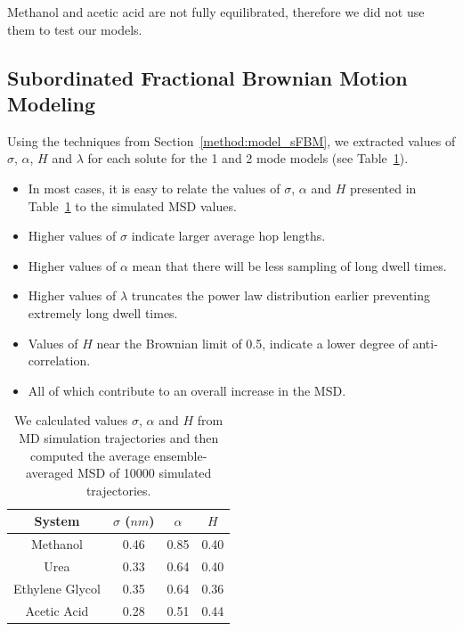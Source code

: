 \documentclass{article}
\begin{document}
  Methanol and acetic acid are not fully equilibrated, therefore we did not use them
  to test our models.

  \subsection{Subordinated Fractional Brownian Motion Modeling}\label{section:sFBM}
  
  Using the techniques from Section~\ref{method:model_sFBM}, we extracted values 
  of $\sigma$, $\alpha$, $H$ and $\lambda$ for each solute for the 1 and 2 mode models 
  (see Table~\ref{table:sfbm_params}).
  \begin{itemize}
    \item In most cases, it is easy to relate the values of $\sigma$, $\alpha$ 
    and $H$ presented in Table~\ref{table:sfbm_params} to the simulated MSD values. 
  	\item Higher values of $\sigma$ indicate larger average hop lengths.
  	\item Higher values of $\alpha$ mean that there will be less sampling of 
  	long dwell times.
  	\item Higher values of $\lambda$ truncates the power law distribution earlier
  	preventing extremely long dwell times.
  	\item Values of $H$ near the Brownian limit of 0.5, indicate a lower degree
  	of anti-correlation.
  	\item All of which contribute to an overall increase in the MSD.
  \end{itemize}
  
  \begin{table}[h]
  \centering
  \begin{tabular}{cccc}
  \toprule
  System & $\sigma$ ($nm$) & $\alpha$ & $H$ \\
  \midrule
  Methanol & 0.46 & 0.85 & 0.40 \\
  Urea & 0.33 & 0.64 & 0.40 \\
  Ethylene Glycol & 0.35 & 0.64 & 0.36 \\
  Acetic Acid & 0.28 & 0.51 & 0.44 \\
  \bottomrule
  \end{tabular}
  \caption{We calculated values $\sigma$, $\alpha$ and $H$ from MD simulation
  trajectories and then computed the average ensemble-averaged MSD of 10000 
  simulated trajectories.}\label{table:sfbm_params}
  \end{table}
\end{document}

